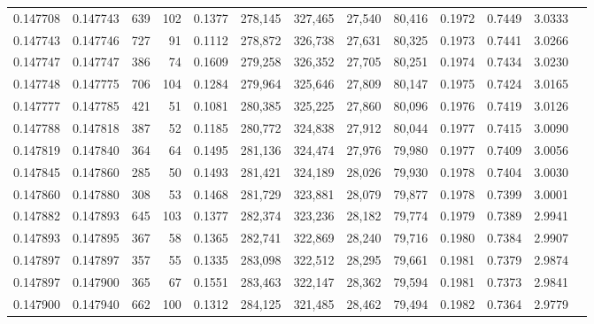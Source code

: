 \begin{tabular}{rrrrrrrrrrrrr}
0.147708 & 0.147743 &   639 & 102 &                                     0.1377 & 278,145 & 327,465 &  27,540 &  80,416 & 0.1972 & 0.7449 & 3.0333 \\
0.147743 & 0.147746 &   727 &  91 &                                     0.1112 & 278,872 & 326,738 &  27,631 &  80,325 & 0.1973 & 0.7441 & 3.0266 \\
0.147747 & 0.147747 &   386 &  74 &                                     0.1609 & 279,258 & 326,352 &  27,705 &  80,251 & 0.1974 & 0.7434 & 3.0230 \\
0.147748 & 0.147775 &   706 & 104 &                                     0.1284 & 279,964 & 325,646 &  27,809 &  80,147 & 0.1975 & 0.7424 & 3.0165 \\
0.147777 & 0.147785 &   421 &  51 &                                     0.1081 & 280,385 & 325,225 &  27,860 &  80,096 & 0.1976 & 0.7419 & 3.0126 \\
0.147788 & 0.147818 &   387 &  52 &                                     0.1185 & 280,772 & 324,838 &  27,912 &  80,044 & 0.1977 & 0.7415 & 3.0090 \\
0.147819 & 0.147840 &   364 &  64 &                                     0.1495 & 281,136 & 324,474 &  27,976 &  79,980 & 0.1977 & 0.7409 & 3.0056 \\
0.147845 & 0.147860 &   285 &  50 &                                     0.1493 & 281,421 & 324,189 &  28,026 &  79,930 & 0.1978 & 0.7404 & 3.0030 \\
0.147860 & 0.147880 &   308 &  53 &                                     0.1468 & 281,729 & 323,881 &  28,079 &  79,877 & 0.1978 & 0.7399 & 3.0001 \\
0.147882 & 0.147893 &   645 & 103 &                                     0.1377 & 282,374 & 323,236 &  28,182 &  79,774 & 0.1979 & 0.7389 & 2.9941 \\
0.147893 & 0.147895 &   367 &  58 &                                     0.1365 & 282,741 & 322,869 &  28,240 &  79,716 & 0.1980 & 0.7384 & 2.9907 \\
0.147897 & 0.147897 &   357 &  55 &                                     0.1335 & 283,098 & 322,512 &  28,295 &  79,661 & 0.1981 & 0.7379 & 2.9874 \\
0.147897 & 0.147900 &   365 &  67 &                                     0.1551 & 283,463 & 322,147 &  28,362 &  79,594 & 0.1981 & 0.7373 & 2.9841 \\
0.147900 & 0.147940 &   662 & 100 &                                     0.1312 & 284,125 & 321,485 &  28,462 &  79,494 & 0.1982 & 0.7364 & 2.9779 \\

\end{tabular}
